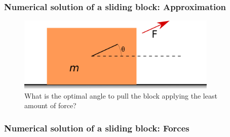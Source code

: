\documentclass[notes]{beamer}
\begin{document}
\begin{frame}
	\frametitle{Numerical solution of a sliding block: Approximation}
	\begin{figure}[ht]
		\centering
		\includegraphics[width=0.85\textwidth]{figs/sliding-block.png}
		\caption*{What is the optimal angle to pull the block applying the least amount of force?}
	\end{figure}
\end{frame}


\begin{frame}
	\frametitle{Numerical solution of a sliding block: Forces}
\end{frame}
\end{document}
